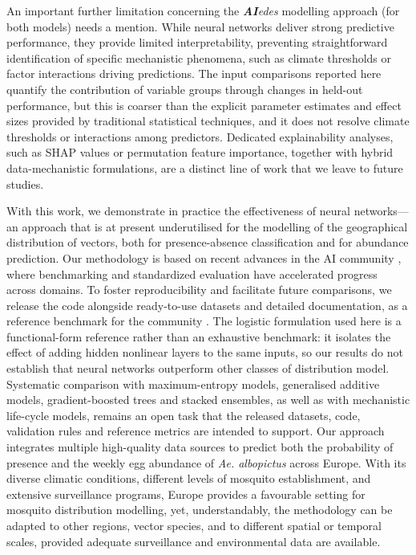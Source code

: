 \documentclass[preprint,12pt]{elsarticle}
\begin{document}
An important further limitation concerning the \textit{\textbf{AI}edes} modelling approach (for both models) needs a mention. While neural networks deliver strong predictive performance, they provide limited interpretability, preventing straightforward identification of specific mechanistic phenomena, such as climate thresholds or factor interactions driving predictions. The input comparisons reported here quantify the contribution of variable groups through changes in held-out performance, but this is coarser than the explicit parameter estimates and effect sizes provided by traditional statistical techniques, and it does not resolve climate thresholds or interactions among predictors. Dedicated explainability analyses, such as SHAP values or permutation feature importance, together with hybrid data-mechanistic formulations, are a distinct line of work that we leave to future studies.

With this work, we demonstrate in practice the effectiveness of neural networks---an approach that is at present underutilised for the modelling of the geographical distribution of vectors, both for presence-absence classification and for abundance prediction. Our methodology is based on recent advances in the AI community \cite{kraemer2025}, where benchmarking and standardized evaluation have accelerated progress across domains. To foster reproducibility and facilitate future comparisons, we release the code alongside ready-to-use datasets and detailed documentation, as a reference benchmark for the community \cite{github2024aiedes, biazzo2026_datasets}. The logistic formulation used here is a functional-form reference rather than an exhaustive benchmark: it isolates the effect of adding hidden nonlinear layers to the same inputs, so our results do not establish that neural networks outperform other classes of distribution model. Systematic comparison with maximum-entropy models, generalised additive models, gradient-boosted trees and stacked ensembles, as well as with mechanistic life-cycle models, remains an open task that the released datasets, code, validation rules and reference metrics are intended to support. Our approach integrates multiple high-quality data sources to predict both the probability of presence and the weekly egg abundance of \textit{Ae. albopictus} across Europe. With its diverse climatic conditions, different levels of mosquito establishment, and extensive surveillance programs, Europe provides a favourable setting for mosquito distribution modelling, yet, understandably, the methodology can be adapted to other regions, vector species, and to different spatial or temporal scales, provided adequate surveillance and environmental data are available.\\
\end{document}
